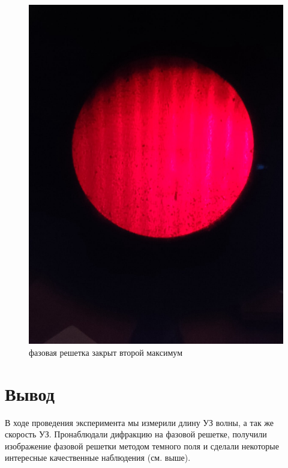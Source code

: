 \begin{figure}[h!]
\begin{center}
\begin{minipage}[h!]{0.48\linewidth}
				\includegraphics[width=1\linewidth]{./images/фазовая_решетка_закрыт_второй_максимум}
				\caption{фазовая решетка закрыт второй максимум}
				\label{3}
			\end{minipage}
		\end{center}
	\end{figure}

	\section{Вывод}
	
	В ходе проведения эксперимента мы измерили длину УЗ волны, а так же скорость УЗ. Пронаблюдали дифракцию на фазовой решетке, получили изображение фазовой решетки методом темного поля и сделали некоторые интересные качественные наблюдения (см. выше). 

